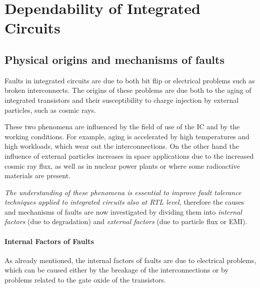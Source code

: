 {{{		} %
	}%
	\section{Dependability of Integrated Circuits}{
		
		\subsection{Physical origins and mechanisms of faults}{
			Faults in integrated circuits are due to both bit flip or electrical problems such as broken interconnects. The origins of these problems are due both to the aging of integrated transistors and their susceptibility to charge injection by external particles, such as cosmic rays.
			
			
			These two phenomena are influenced by the field of use of the IC and by the working conditions. For example, aging is accelerated by high temperatures and high workloads, which wear out the interconnections. On the other hand the influence of external particles increases in space applications due to the increased cosmic ray flux, as well as in nuclear power plants or where some radioactive materials are present.
			
			
			\textit{The understanding of these phenomena is essential to improve fault tolerance techniques applied to integrated circuits also at RTL level}, therefore the causes and mechanisms of faults are now investigated by dividing them into \textit{internal factors} (due to degradation) and \textit{external factors} (due to particle flux or EMI).
			
			\paragraph{Internal Factors of Faults}{
				As already mentioned, the internal factors of faults are due to electrical problems, which can be caused either by the breakage of the interconnections or by problems related to the gate oxide of the transistors.
				
}}}}

